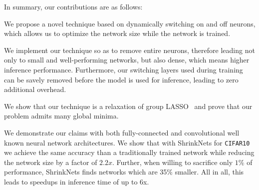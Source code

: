 In summary, our contributions are as follows: 

\begin{compactenum}

\item We propose a novel technique based on dynamically switching on and off neurons, 
which allows us to optimize the network size while the network is trained. 

\item We implement our technique so as to remove entire neurons, therefore
leading not only to small and well-performing networks, but also dense, which
means higher inference performance. Furthermore, our switching layers used during training can be 
savely removed before the model is used for inference, leading to zero additional overhead. 


\item We show that our technique is a relaxation of group LASSO~\cite{Yuan2006}
and prove that our problem admits many global minima.

\item We demonstrate our claims with both fully-connected and convolutional well
known neural network architectures. We show that with ShrinkNets for
\texttt{CIFAR10} we achieve the same accuracy than a traditionally trained
network while reducing the network size by a factor of $2.2x$. Further, when
willing to sacrifice only $1$\% of performance, ShrinkNets finds networks which
are 35\% smaller. All in all, this leads to speedups in inference time of up to
6x. 


%
%

\end{compactenum}



